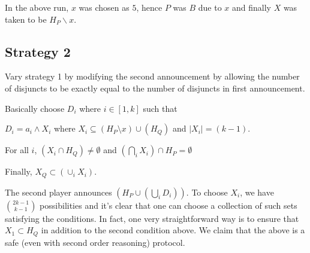 In the above run, $x$ was chosen as $5$, hence $P$ was $B$ due to $x$ and
finally $X$ was taken to be $H_P \backslash x$.

\subsection{Strategy 2}

Vary strategy 1 by modifying the second
announcement by allowing the number of disjuncts to be exactly 
equal to the number of disjuncts in first announcement.

Basically choose $D_i$ where $i \in [1,k]$ such that
\begin{compactenum}[a)]
\item $D_i = a_i \wedge X_i$ where 
  $X_i \subseteq (H_P \setminus x) \cup (H_Q)$
  and $|X_i| = (k-1)$.
\item For all $i$, $(X_i \cap H_{Q}) \neq \emptyset$ and $(\bigcap_i X_i) \cap H_P =  \emptyset$
\item Finally, $X_Q \subset (\cup_i X_i)  $.
\end{compactenum}

The second player announces $(H_P \cup (\bigcup_i D_i))$.
To choose $X_i$, we have $\binom{2k-1}{k-1}$ possibilities
and it's clear that one can choose a collection of such
sets satisfying the conditions. In fact, one very straightforward
way is to ensure that $X_1 \subset H_Q$ in addition to
the second condition above. We claim that the above is a safe 
(even with second order reasoning) protocol.

%
%

